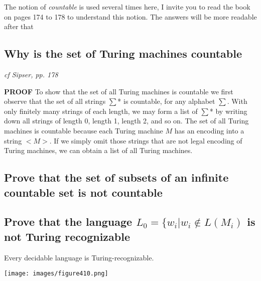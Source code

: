 \documentclass[main.tex]{subfiles}
\begin{document}
The notion of \emph{countable} is used several times here, I invite you to read the book on pages 174 to 178 to understand this notion. The answers will be more readable after that

\subsection{Why is the set of Turing machines countable} 
\emph{cf Sipser, pp. 178}
\par\textbf{PROOF} To show that the set of all Turing machines is countable we first observe that the set of all strings $\sum$* is countable, for any alphabet $\sum$. With only
finitely many strings of each length, we may form a list of $\sum$* by writing down
all strings of length 0, length 1, length 2, and so on.
The set of all Turing machines is countable because each Turing machine $M$
has an encoding into a string $<M>$. If we simply omit those strings that are not
legal encoding of Turing machines, we can obtain a list of all Turing machines. 
\subsection{Prove that the set of subsets of an infinite countable set is not countable}
\subsection{Prove that the language $L_0 = \{ w_i | w_i \notin L(M_i)$ is not Turing recognizable}
Every decidable language is Turing-recognizable.
\begin{center}
    \texttt{[image: images/figure410.png]}
\end{center}
\end{document}
